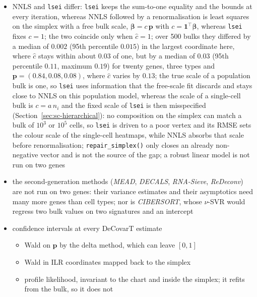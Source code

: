 \documentclass[pdflatex, sn-nature]{sn-jnl}
\theoremstyle{thmstyleone}%
\theoremstyle{thmstyletwo}%
\theoremstyle{thmstylethree}%
\begin{document}
\begin{itemize}
\begin{itemize}
          the benchmark: they maximise the same likelihood as Newton--Raphson, more slowly
  \end{itemize}
  \item NNLS and \texttt{lsei} differ: \texttt{lsei} keeps the sum-to-one equality and the bounds at every iteration,
        whereas NNLS followed by a renormalisation is least squares on the simplex with a free bulk scale, \(\boldsymbol{\beta}=c\,\boldsymbol{p}\) with \(c=\mathbf{1}^{\top}\boldsymbol{\beta}\), whereas
        \texttt{lsei} fixes \(c=1\); the two coincide only when \(\hat c=1\); over 500 bulks they differed by a median of
        \(0.002\) (95th percentile \(0.015\)) in the largest coordinate here, where \(\hat c\) stays within about \(0.03\)
        of one, but by a median of \(0.03\) (95th percentile \(0.11\), maximum \(0.19\)) for twenty genes, three types
        and \(\boldsymbol{p}=(0.84,0.08,0.08)\), where \(\hat c\) varies by \(0.13\); the true scale of a population bulk is
        one, so \texttt{lsei} uses information that the free-scale fit discards and stays close to NNLS on this
        population model, whereas the scale of a single-cell bulk
        is \(c=a\,n_{i}\) and the fixed scale of \texttt{lsei} is then misspecified
        (Section~\ref{sec:sc-hierarchical}): no composition on the simplex can match a bulk of \(10^{3}\) or
        \(10^{5}\) cells, so \texttt{lsei} is driven to a poor vertex and its RMSE sets the colour scale of
        the single-cell heatmaps, while NNLS absorbs that scale before renormalisation;
        \texttt{repair\_simplex()} only closes an already non-negative vector and is not the source of the gap;
        a robust
        linear model is not run on two genes
  \item the second-generation methods (\emph{MEAD}, \emph{DECALS}, \emph{RNA-Sieve}, \emph{ReDeconv}) are not run
        on two genes: their variance estimates and their asymptotics need many more genes than cell types; nor is
        \emph{CIBERSORT}, whose \(\nu\)-SVR would regress two bulk values on two signatures and an intercept
  \item confidence intervals at every DeCovarT estimate
  \begin{itemize}
    \item Wald on \(\boldsymbol{p}\) by the delta method, which can leave \([0,1]\)
    \item Wald in ILR coordinates mapped back to the simplex
    \item profile likelihood, invariant to the chart and inside the simplex; it refits from the bulk, so it does not

\end{itemize}
\end{itemize}
\end{document}
